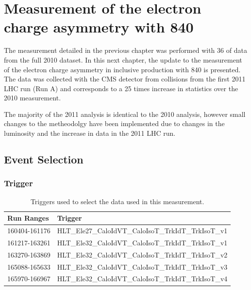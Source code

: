 \chapter[Electron Charge Asymmetry]{ 
Measurement of the electron charge asymmetry with \unit{840}{\invpb} }

The measurement detailed in the previous chapter was performed with
\unit{36}{\invpb} of data from the full 2010 dataset. 
In this next chapter, the update to the measurement of the electron charge asymmetry in
inclusive \inclusiveWe production with \unit{840}{\invpb} is presented. 
The data was collected with the \ac{CMS} detector from collisions from the
first 2011 \ac{LHC} run (Run A) and corresponds to a 25 times increase in
statistics over the 2010 measurement.


The majority of the 2011 analysis is identical to the 2010 analysis,
however small changes to the metheodolgy have been implemented due to changes
in the luminosity and the increase in data in the 2011 \ac{LHC} run.

\section{Event Selection}
\subsection{Trigger}


\begin{table}[htbp]
  \begin{center}
    \leavevmode
     \begin{tabular}{ll} 
      Run Ranges & Trigger  \\
     \hline
     160404-161176 & HLT\_Ele27\_CaloIdVT\_CaloIsoT\_TrkIdT\_TrkIsoT\_v1  \\
     161217-163261 & HLT\_Ele32\_CaloIdVT\_CaloIsoT\_TrkIdT\_TrkIsoT\_v1  \\
     163270-163869 & HLT\_Ele32\_CaloIdVT\_CaloIsoT\_TrkIdT\_TrkIsoT\_v2  \\
     165088-165633 & HLT\_Ele32\_CaloIdVT\_CaloIsoT\_TrkIdT\_TrkIsoT\_v3  \\
     165970-166967 & HLT\_Ele32\_CaloIdVT\_CaloIsoT\_TrkIdT\_TrkIsoT\_v4  \\
     \end{tabular}

  \caption{Triggers used to select the data used in this measurement.}
  \label{asym840:triggers}

   \end{center}
\end{table}


